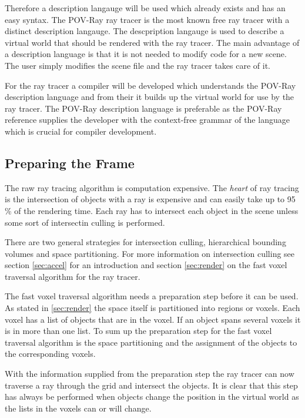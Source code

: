 \documentclass[DIV10, abstracton, openright, footsepline, headsepline, twoside, 9pt,
bigheadings]{scrreprt}
\begin{document}
Therefore a description langauge will be used which already exists and has
an easy syntax. The POV-Ray ray tracer is the most known free ray tracer
with a distinct description langauge. The descpription langauge is used
to describe a virtual world that should be rendered with the ray tracer. The
main advantage of a description language is that it is not needed to modify
code for a new scene. The user simply modifies the scene file and the ray
tracer takes care of it.

For the ray tracer a compiler will be developed which understands the
POV-Ray description language and from their it builds up the virtual world
for use by the ray tracer. The POV-Ray description language is preferable
as the POV-Ray reference supplies the developer with the context-free
grammar of the language which is crucial for compiler development.

\subsection{Preparing the Frame}
\label{sec:analysis_preparing_frame}
\label{sec:analysis_prepare_frame}

The raw ray tracing algorithm is computation expensive. The \textit{heart}
of ray tracing is the intersection of objects with a ray is expensive and
can easily take up to 95 \% of the rendering time. Each ray has to intersect
each object in the scene unless some sort of intersectin culling is performed.

There are two general strategies for intersection culling, hierarchical bounding
volumes and space partitioning. For more information on intersection
culling see section \ref{sec:accel} for an introduction and section \ref{sec:render}
on the fast voxel traversal algorithm for the ray tracer.

The fast voxel traversal algorithm needs a preparation step before it can be
used. As stated in \ref{sec:render} the space itself is partitioned into regions
or voxels. Each voxel has a list of objects that are in the voxel. If an object
spans several voxels it is in more than one list. To sum up the preparation step
for the fast voxel traversal algorithm is the space partitioning and the assignment
of the objects to the corresponding voxels.

With the information supplied from the preparation step the ray tracer can now
traverse a ray through the grid and intersect the objects. It is clear that this
step has always be performed when objects change the position in the virtual world
as the lists in the voxels can or will change.
\end{document}
